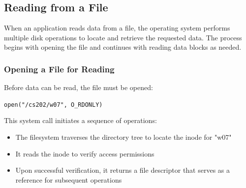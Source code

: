 \documentclass[../../compsys.tex]{subfiles}
\begin{document}
\subsection{Reading from a File}
When an application reads data from a file, the operating system performs multiple disk operations to locate and retrieve the requested data. The process begins with opening the file and continues with reading data blocks as needed.

\subsubsection{Opening a File for Reading}
Before data can be read, the file must be opened:

\begin{example}
\texttt{open("/cs202/w07", O\_RDONLY)}
\end{example}

This system call initiates a sequence of operations:
\begin{itemize}
    \item The filesystem traverses the directory tree to locate the inode for "w07"
    \item It reads the inode to verify access permissions
    \item Upon successful verification, it returns a file descriptor that serves as a reference for subsequent operations
\end{itemize}
\end{document}
